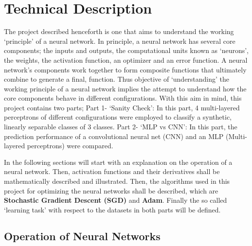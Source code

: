 \section{Technical Description}

The project described henceforth is one that aims to understand the working `principle' of a neural network. In principle,
a neural network has several core components; the inputs and outputs, the computational units known as `neurons', 
the weights, the activation function, an optimizer and an error function. A neural network's components work together 
to form composite functions that ultimately combine to generate a final, function. Thus objective of `understanding' 
the working principle of a neural network implies the attempt to understand how the core components behave in different
configurations. With this aim in mind, this project contains two parts; Part 1- `Sanity Check': In this part, 
4 multi-layered perceptrons of different configurations were employed to classify a synthetic, linearly separable 
classes of 3 classes. Part 2- `MLP vs CNN': In this part, the prediction performance of a convolutional neural net (CNN)
and an MLP (Multi-layered perceptrons) were compared. 

In the following sections will start with an explanation on the operation of a neural network. Then, activation
functions and their derivatives shall be mathematically described and illustrated. Then, the algorithms used 
in this project for optimizing the neural networks shall be described, which are \textbf{Stochastic Gradient Descent (SGD)}
and \textbf{Adam}. Finally the so called `learning task' with respect to the datasets in both parts will be defined.

\subsection{Operation of Neural Networks}

